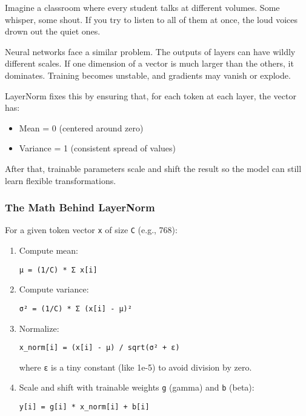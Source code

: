 \documentclass[
  letterpaper,
  DIV=11,
  numbers=noendperiod]{scrreprt}
\providecommand{\tightlist}{%
  \setlength{\itemsep}{0pt}\setlength{\parskip}{0pt}}
\begin{document}
Imagine a classroom where every student talks at different volumes. Some
whisper, some shout. If you try to listen to all of them at once, the
loud voices drown out the quiet ones.

Neural networks face a similar problem. The outputs of layers can have
wildly different scales. If one dimension of a vector is much larger
than the others, it dominates. Training becomes unstable, and gradients
may vanish or explode.

LayerNorm fixes this by ensuring that, for each token at each layer, the
vector has:

\begin{itemize}
\tightlist
\item
  Mean = 0 (centered around zero)
\item
  Variance = 1 (consistent spread of values)
\end{itemize}

After that, trainable parameters scale and shift the result so the model
can still learn flexible transformations.

\subsubsection{The Math Behind
LayerNorm}\label{the-math-behind-layernorm}

For a given token vector \texttt{x} of size \texttt{C} (e.g., 768):

\begin{enumerate}
\def\labelenumi{\arabic{enumi}.}
\item
  Compute mean:

\begin{verbatim}
μ = (1/C) * Σ x[i]
\end{verbatim}
\item
  Compute variance:

\begin{verbatim}
σ² = (1/C) * Σ (x[i] - μ)²
\end{verbatim}
\item
  Normalize:

\begin{verbatim}
x_norm[i] = (x[i] - μ) / sqrt(σ² + ε)
\end{verbatim}

  where \texttt{ε} is a tiny constant (like 1e-5) to avoid division by
  zero.
\item
  Scale and shift with trainable weights \texttt{g} (gamma) and
  \texttt{b} (beta):

\begin{verbatim}
y[i] = g[i] * x_norm[i] + b[i]
\end{verbatim}
\end{enumerate}
\end{document}
